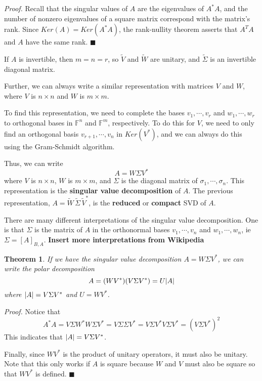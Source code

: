 \documentclass[a4paper,10pt]{book}
\newcommand{\F}{\mathbb{F}}
\theoremstyle{plain}
\newtheorem{theorem}{Theorem}[section]
\renewenvironment{proof}{\textsl{Proof.}}{\hfill$\blacksquare$}
\theoremstyle{plain}
\theoremstyle{definition}
\begin{document}
\begin{proof}
Recall that the singular values of $A$ are the eigenvalues of $A^{*}A$, and the number of nonzero eigenvalues of a square matrix correspond with the matrix's rank.  Since $Ker(A) = Ker(A^{*}A)$, the rank-nullity theorem asserts that $A^{T}A$ and $A$ have the same rank. 
\end{proof}

If $A$ is invertible, then $m = n = r$, so $\widetilde{V}$ and $\widetilde{W}$ are unitary, and $\widetilde{\Sigma}$ is an invertible diagonal matrix. 

Further, we can always write a similar representation with matrices $V$ and $W$, where $V$ is $n \times n$ and $W$ is $m \times m$. 

To find this representation, we need to complete the bases $v_{1}, \cdots, v_{r}$ and $w_{1}, \cdots, w_{r}$ to orthogonal bases in $\F^{n}$ and $\F^{m}$, respectively. To do this for $V$, we need to only find an orthogonal basis $v_{r+1}, \cdots, v_{n}$ in $Ker(V^{*})$, and we can always do this using the Gram-Schmidt algorithm. 

Thus, we can write 
$$A = W \Sigma V^{*}$$
where $V$ is $n \times n$, $W$ is $m \times m$, and $\Sigma$ is the diagonal matrix of $\sigma_{1}, \cdots, \sigma_{n}$. This representation is the \textbf{singular value decomposition} of $A$. The previous representation, $A = \widetilde{W} \, \widetilde{\Sigma} \, \widetilde{V}^{*}$, is the \textbf{reduced} or \textbf{compact} SVD of $A$.

There are many different interpretations of the singular value decomposition. One is that $\Sigma$ is the matrix of $A$ in the orthonormal bases $v_{1}, \cdots, v_{n}$ and $w_{1}, \cdots, w_{n}$, ie $\Sigma = [A]_{B, A}$. \textbf{Insert more interpretations from Wikipedia}

\begin{theorem}
If we have the singular value decomposition $A = W \Sigma V^{*}$, we can write the polar decomposition
$$A = (WV^{*}) (V \Sigma V^{*}) = U \lvert A\rvert$$
where $\lvert A\rvert = V \Sigma V^{*}$ and $U = WV^{*}$. 
\end{theorem}

\begin{proof}
Notice that 
$$A^{*} A = V \Sigma W^{*} W \Sigma V^{*} = V \Sigma \Sigma V^{*} = V \Sigma V^{*} V \Sigma V^{*} = (V \Sigma V^{*})^{2}$$
This indicates that $\lvert A\rvert = V \Sigma V^{*}$. 

Finally, since $WV^{*}$ is the product of unitary operators, it must also be unitary. Note that this only works if $A$ is square because $W$ and $V$ must also be square so that $WV^{*}$ is defined. 
\end{proof}
\end{document}
